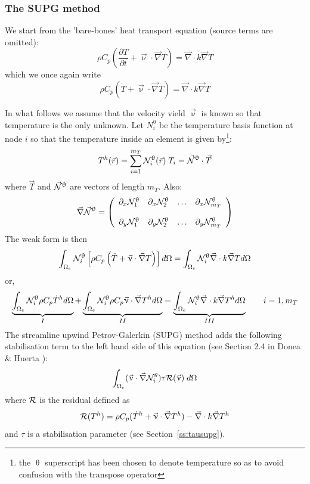 \newpage
\subsubsection{The SUPG method}

We start from the 'bare-bones' heat transport equation (source terms are omitted): 
\begin{equation}
\rho C_p \left( \frac{\partial T}{\partial t} + {\vec \upnu}\cdot {\vec\nabla T} \right)
= {\vec \nabla} \cdot k \vec\nabla T 
\end{equation}
which we once again write 
\begin{equation}
\rho C_p \left(\dot{T} + {\vec \upnu}\cdot {\vec\nabla T} \right)
= {\vec \nabla} \cdot k \vec\nabla T 
\end{equation}

In what follows we assume that the velocity vield $\vec \upnu$ is known so that temperature is the
only unknown.
Let $N^\uptheta_i$ be the temperature basis function at node $i$ so that the temperature inside an element is
given by\footnote{the $\uptheta$ superscript has been chosen to denote temperature so as to avoid confusion
with the transpose operator}:
\begin{equation}
T^h({\vec r}) = \sum_{i=1}^{m_T} {\mathcal{N}}^\uptheta_i ({\vec r})\;  T_i = \vec {{\mathcal{N}}}^\uptheta \cdot \vec T
\end{equation}
where $\vec T$ and $\vec {{\mathcal{N}}}^\uptheta$ are vectors of length $m_T$. Also:
\[
\vec \nabla \vec {{\mathcal{N}}}^\uptheta = 
\left(
\begin{array}{cccc}
\partial_x {\mathcal{N}}_1^\uptheta & 
\partial_x {\mathcal{N}}_2^\uptheta & \dots &
\partial_x {\mathcal{N}}_{m_T}^\uptheta \\ \\
\partial_y {\mathcal{N}}_1^\uptheta & 
\partial_y {\mathcal{N}}_2^\uptheta & \dots &
\partial_y {\mathcal{N}}_{m_T}^\uptheta 
\end{array}
\right)
\]
The weak form is then
\begin{equation}
\int_{\Omega_e} {\mathcal{N}}^\uptheta_i \left[ 
\rho C_p \left( \dot{T} + {\vec \upnu}\cdot {\vec\nabla T} \right) \right] d\Omega
= \int_{\Omega_e}  {\mathcal{N}}^\uptheta_i {\vec \nabla} \cdot k \vec\nabla T  d\Omega
\end{equation}
or,
\[
\underbrace{\int_{\Omega_e} {\mathcal{N}}^\uptheta_i  \rho C_p \dot{T}^h d\Omega}_{I}
+ \underbrace{\int_{\Omega_e} {\mathcal{N}}^\uptheta_i  \rho C_p  {\vec \upnu}\cdot {\vec\nabla T^h}   d\Omega}_{II}
= \underbrace{\int_{\Omega_e}  {\mathcal{N}}^\uptheta_i {\vec \nabla} \cdot k \vec\nabla T^h d\Omega}_{III}
\quad\quad
i=1,m_T
\]
The streamline upwind Petrov-Galerkin (SUPG) 
method adds the following stabilisation term to the left hand side of this equation (see Section 2.4 
in Donea \& Huerta \cite{dohu03}):
\[
\int_{\Omega_e} (\vec\upnu\cdot\vec\nabla {\mathcal{N}}_i^\theta ) \tau {\cal R}(\vec\upnu) \; d\Omega
\]
where ${\cal R}$ is the residual defined as
\[
{\cal R}(T^h) = 
\rho C_p (\dot{T}^h +  {\vec \upnu}\cdot {\vec\nabla T^h}) - {\vec \nabla} \cdot k \vec\nabla T^h 
\]
and $\tau$ is a stabilisation parameter (see Section~\ref{ss:tausupg}).

